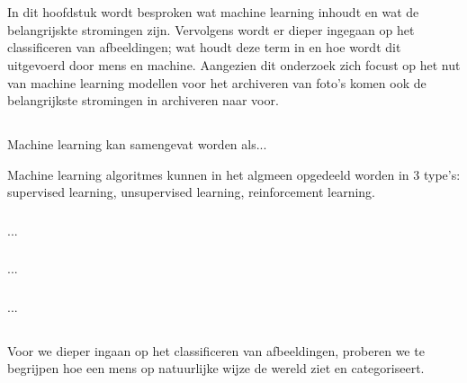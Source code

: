 \chapter{}
\label{ch:stand-van-zaken}


In dit hoofdstuk wordt besproken wat machine learning inhoudt en wat de belangrijskte stromingen zijn. Vervolgens wordt er dieper ingegaan op het classificeren van afbeeldingen; wat houdt deze term in en hoe wordt dit uitgevoerd door mens en machine. Aangezien dit onderzoek zich focust op het nut van machine learning modellen voor het archiveren van foto's komen ook de belangrijkste stromingen in archiveren naar voor.

\section{}
\label{sec:machine-learning}
Machine learning kan samengevat worden als...

Machine learning algoritmes kunnen in het algmeen opgedeeld worden in 3 type's: supervised learning, unsupervised learning, reinforcement learning.

\subsection{}
\label{sec:supervised-learning}
...
\subsection{}
\label{sec:unsupervised-learning}
...
\subsection{}
\label{sec:reinforcement-learning}
...

\section{}
\label{sec:classificeren-van-afbeeldingen}
Voor we dieper ingaan op het classificeren van afbeeldingen, proberen we te begrijpen hoe een mens op natuurlijke wijze de wereld ziet en categoriseert. 

